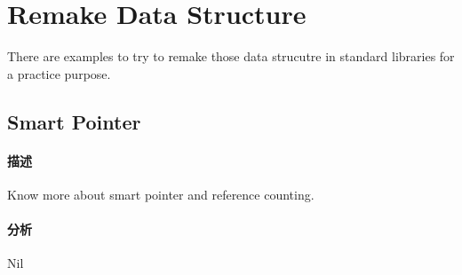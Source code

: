 \chapter{Remake Data Structure}
There are examples to try to remake those data strucutre in standard libraries for a practice purpose.
\newline

\section{Smart Pointer} %
\label{sec:smart-pointer}


\subsubsection{描述}
Know more about smart pointer and reference counting.

\subsubsection{分析}
Nil


